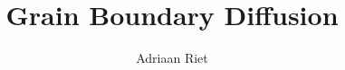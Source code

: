 \documentclass{article}
\author{Adriaan Riet}
\title{Grain Boundary Diffusion}
\begin{document}
\maketitle{}

%
\end{document}

